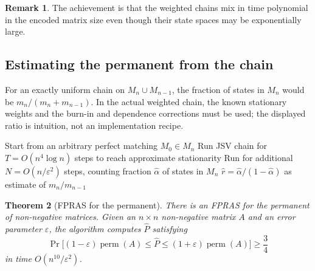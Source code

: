 \documentclass[twoside,12pt]{book}
\theoremstyle{plain}
\newtheorem{theorem}{Theorem}[chapter]
\theoremstyle{definition}
\newtheorem{remark}[theorem]{Remark}
\theoremstyle{remark}
\begin{document}
\begin{remark}
The achievement is that the weighted chains mix in time polynomial in the
encoded matrix size even though their state spaces may be exponentially large.
\end{remark}

\subsection{Estimating the permanent from the chain}

For an exactly uniform chain on $M_n\cup M_{n-1}$, the fraction of states in
$M_n$ would be $m_n/(m_n+m_{n-1})$. In the actual weighted chain, the known
stationary weights and the burn-in and dependence corrections must be used;
the displayed ratio is intuition, not an implementation recipe.

\begin{algorithm}
\caption{Karp--Luby Estimation of $m_n / m_{n-1}$}
\label{alg:perm-ratio}
\begin{algorithmic}[1]
    \State Start from an arbitrary perfect matching $M_0 \in M_n$ 
    \State Run JSV chain for $T = O(n^4 \log n)$ steps to reach approximate stationarity
    \State Run for additional $N = O(n/\varepsilon^2)$ steps, counting fraction $\hat{\alpha}$ of states in $M_n$
    \State \Return $\hat{r} = \hat{\alpha} / (1 - \hat{\alpha})$ as estimate of $m_n / m_{n-1}$
\EndFunction
\end{algorithmic}
\end{algorithm}

\begin{theorem}[FPRAS for the permanent]
\label{thm:perm-fpras}
There is an FPRAS for the permanent of non-negative matrices. Given an $n \times n$ non-negative matrix $A$ and an error parameter $\varepsilon$, the algorithm computes $\hat{P}$ satisfying
\[
\Pr\!\bigl[(1 - \varepsilon) \operatorname{perm}(A) \leq \hat{P} \leq (1 + \varepsilon) \operatorname{perm}(A)\bigr] \geq \frac{3}{4}
\]
in time $O(n^{10} / \varepsilon^2)$.
\end{theorem}
\end{document}
